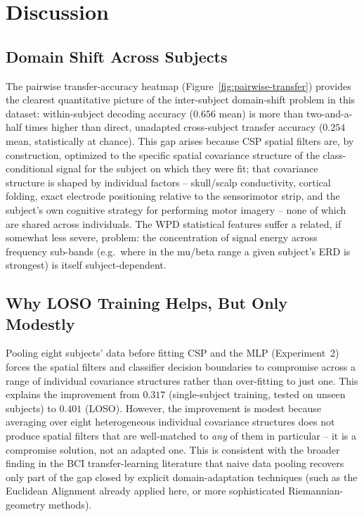 \documentclass[11pt,a4paper]{article}
\begin{document}
\section{Discussion}
\label{sec:discussion}

\subsection{Domain Shift Across Subjects}
The pairwise transfer-accuracy heatmap (Figure~\ref{fig:pairwise-transfer}) provides the clearest
quantitative picture of the inter-subject domain-shift problem in this dataset: within-subject
decoding accuracy ($0.656$ mean) is more than two-and-a-half times higher than direct,
unadapted cross-subject transfer accuracy ($0.254$ mean, statistically at chance). This gap arises
because CSP spatial filters are, by construction, optimized to the specific spatial covariance
structure of the class-conditional signal for the subject on which they were fit; that covariance
structure is shaped by individual factors -- skull/scalp conductivity, cortical folding, exact
electrode positioning relative to the sensorimotor strip, and the subject's own cognitive strategy for
performing motor imagery -- none of which are shared across individuals. The WPD statistical features
suffer a related, if somewhat less severe, problem: the concentration of signal energy across
frequency sub-bands (e.g.\ where in the mu/beta range a given subject's ERD is strongest) is itself
subject-dependent.

\subsection{Why LOSO Training Helps, But Only Modestly}
Pooling eight subjects' data before fitting CSP and the MLP (Experiment~2) forces the spatial filters
and classifier decision boundaries to compromise across a range of individual covariance structures
rather than over-fitting to just one. This explains the improvement from $0.317$ (single-subject
training, tested on unseen subjects) to $0.401$ (LOSO). However, the improvement is modest because
averaging over eight heterogeneous individual covariance structures does not produce spatial filters
that are well-matched to \emph{any} of them in particular -- it is a compromise solution, not an
adapted one. This is consistent with the broader finding in the BCI transfer-learning literature that
naive data pooling recovers only part of the gap closed by explicit domain-adaptation techniques (such
as the Euclidean Alignment already applied here, or more sophisticated Riemannian-geometry methods).
\end{document}
